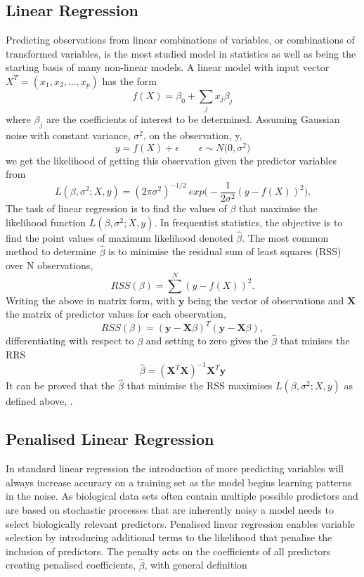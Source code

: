 \documentclass[../main.tex]{subfiles}
\begin{document}
\subsection{Linear Regression}

Predicting observations from linear combinations of variables, or combinations of transformed variables, is the most studied model in statistics as well as being the starting basis of many non-linear models.
A linear model with input vector $X^T = (x_1, x_2, ..., x_p)$ has the form
$$f(X) = \beta_0 +\sum_j x_j\beta_j$$
where $\beta_j$ are the coefficients of interest to be determined.
Assuming Gaussian noise with constant variance, $\sigma^2$, on the observation, y, 
$$y = f(X) + \epsilon \qquad \epsilon \sim N \big(0,\sigma^2\big) $$
we get the likelihood of getting this observation given the predictor variables from
$$L(\beta,\sigma^2;X,y)=(2\pi\sigma^2)^{-1/2}\ exp\Big( -\frac{1}{2\sigma^2} (y-f(X))^2 \Big).$$
The task of linear regression is to find the values of $\beta$ that maximise the likelihood function $L(\beta,\sigma^2;X,y)$.
In frequentist statistics, the objective is to find the point values of maximum likelihood denoted $\hat\beta$.
The most common method to determine $\hat\beta$ is to minimise the residual sum of least squares (RSS) over N observations,
$$RSS(\beta) = \sum^N(y-f(X))^2.$$
Writing the above in matrix form, with $\mathbf{y}$ being the vector of observations and $\mathbf{X}$ the matrix of predictor values for each observation,
$$RSS(\beta) = (\mathbf{y}-\mathbf{X}\beta)^T(\mathbf{y}-\mathbf{X}\beta),$$
differentiating with respect to $\beta$ and setting to zero gives the $\hat\beta$ that minises the RRS
$$\hat\beta = (\mathbf{X}^T\mathbf{X})^{-1}\mathbf{X}^T\mathbf{y}$$
It can be proved that the $\hat\beta$ that minimise the RSS maximises $L(\beta,\sigma^2;X,y)$ as defined above, \parencite{Hastie2009}.

\subsection{Penalised Linear Regression}

In standard linear regression the introduction of more predicting variables will always increase accuracy on a training set as the model begins learning patterns in the noise.
As biological data sets often contain multiple possible predictors and are based on stochastic processes that are inherently noisy a model needs to select biologically relevant predictors.
Penalised linear regression enables variable selection by introducing additional terms to the likelihood that penalise the inclusion of predictors.
The penalty acts on the coefficients of all predictors creating penalised coefficients, $\hat{\beta}$, with general definition
\end{document}
